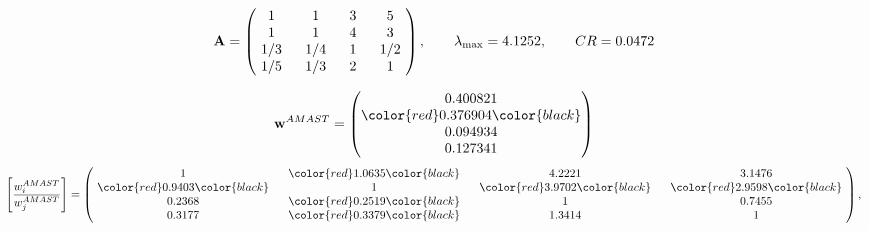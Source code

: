 \begin{example}
\begin{equation*}
\mathbf{A} =
\begin{pmatrix}
$\,\,$ 1 $\,\,$ & $\,\,$1$\,\,$ & $\,\,$3$\,\,$ & $\,\,$5 $\,\,$ \\
$\,\,$ 1 $\,\,$ & $\,\,$ 1 $\,\,$ & $\,\,$4$\,\,$ & $\,\,$3 $\,\,$ \\
$\,\,$ 1/3$\,\,$ & $\,\,$ 1/4$\,\,$ & $\,\,$ 1 $\,\,$ & $\,\,$ 1/2 $\,\,$ \\
$\,\,$ 1/5$\,\,$ & $\,\,$ 1/3$\,\,$ & $\,\,$2$\,\,$ & $\,\,$ 1  $\,\,$ \\
\end{pmatrix},
\qquad
\lambda_{\max} =
4.1252,
\qquad
CR = 0.0472
\end{equation*}

\begin{equation*}
\mathbf{w}^{AMAST} =
\begin{pmatrix}
0.400821\\
\color{red} 0.376904\color{black} \\
0.094934\\
0.127341
\end{pmatrix}\end{equation*}
\begin{equation*}
\left[ \frac{{w}^{AMAST}_i}{{w}^{AMAST}_j} \right] =
\begin{pmatrix}
$\,\,$ 1 $\,\,$ & $\,\,$\color{red} 1.0635\color{black} $\,\,$ & $\,\,$4.2221$\,\,$ & $\,\,$3.1476$\,\,$ \\
$\,\,$\color{red} 0.9403\color{black} $\,\,$ & $\,\,$ 1 $\,\,$ & $\,\,$\color{red} 3.9702\color{black} $\,\,$ & $\,\,$\color{red} 2.9598\color{black}   $\,\,$ \\
$\,\,$0.2368$\,\,$ & $\,\,$\color{red} 0.2519\color{black} $\,\,$ & $\,\,$ 1 $\,\,$ & $\,\,$0.7455 $\,\,$ \\
$\,\,$0.3177$\,\,$ & $\,\,$\color{red} 0.3379\color{black} $\,\,$ & $\,\,$1.3414$\,\,$ & $\,\,$ 1  $\,\,$ \\
\end{pmatrix},
\end{equation*}


\end{example}
